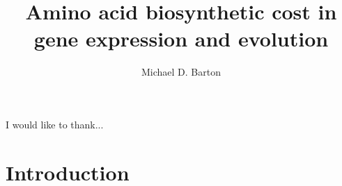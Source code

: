 \documentclass[12pt,PhD]{muthesis}
\begin{document}
\title{Amino acid biosynthetic cost in gene expression and evolution}
\author{Michael D. Barton}

\beforeabstract
{}

\afterabstract
{}
I would like to thank...
\afterpreface


\chapter{Introduction}

\end{document}

